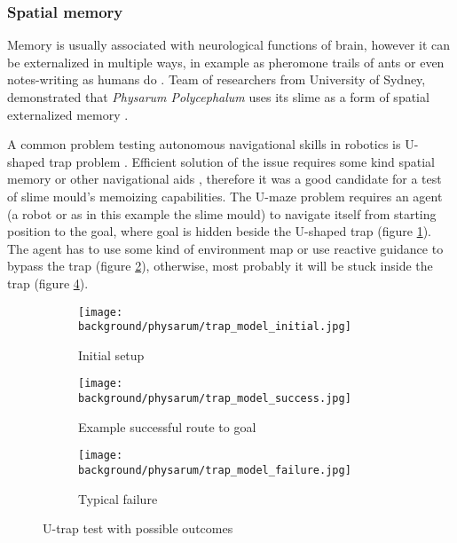\subsubsection{Spatial memory}

Memory is usually associated with neurological functions of brain, however it can be externalized in multiple ways, in example as pheromone trails of ants \cite{carroll1973ecology} or even notes-writing as humans do \cite{fisher1973effect}. Team of researchers from University of Sydney, demonstrated that \textit{Physarum Polycephalum} uses its slime as a form of spatial externalized memory \cite{reid2012slime}.

A common problem testing autonomous navigational skills in robotics is U-shaped trap problem \cite{chatterjee2001use}. Efficient solution of the issue requires some kind spatial memory or other navigational aids \cite{balch1993avoiding}, therefore it was a good candidate for a test of slime mould's memoizing capabilities. The U-maze problem requires an agent (a robot or as in this example the slime mould) to navigate itself from starting position to the goal, where goal is hidden beside the U-shaped trap (figure \ref{figure:bp_trap_model}). The agent has to use some kind of environment map or use reactive guidance to bypass the trap (figure \ref{figure:bp_trap_model_success}), otherwise, most probably it will be stuck inside the trap (figure \ref{figure:bp_trap_model_failure}).

\begin{figure}
  \centering
  \begin{subfigure}{0.45\textwidth}
    \centering
    \texttt{[image: background/physarum/trap\_model\_initial.jpg]}
    \caption{Initial setup}
    \label{figure:bp_trap_model}
  \end{subfigure}
  \begin{subfigure}{0.45\textwidth}
    \centering
    \texttt{[image: background/physarum/trap\_model\_success.jpg]}
    \caption{Example successful route to goal}
    \label{figure:bp_trap_model_success}
  \end{subfigure}
  \begin{subfigure}{0.45\textwidth}
    \centering
    \texttt{[image: background/physarum/trap\_model\_failure.jpg]}
    \caption{Typical failure}
    \label{figure:bp_trap_model_failure}
  \end{subfigure}
  \caption{U-trap test with possible outcomes}
\end{figure}

